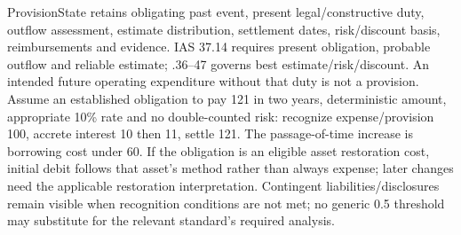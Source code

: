 ProvisionState retains obligating past event, present legal/constructive duty, outflow assessment, estimate distribution, settlement dates, risk/discount basis, reimbursements and evidence. IAS 37.14 requires present obligation, probable outflow and reliable estimate; .36--47 governs best estimate/risk/discount. An intended future operating expenditure without that duty is not a provision. Assume an established obligation to pay 121 in two years, deterministic amount, appropriate 10\% rate and no double-counted risk: recognize expense/provision 100, accrete interest 10 then 11, settle 121. The passage-of-time increase is borrowing cost under 60. If the obligation is an eligible asset restoration cost, initial debit follows that asset's method rather than always expense; later changes need the applicable restoration interpretation. Contingent liabilities/disclosures remain visible when recognition conditions are not met; no generic 0.5 threshold may substitute for the relevant standard's required analysis.

